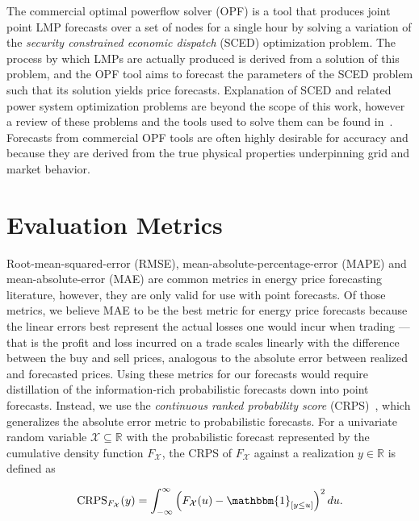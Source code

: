 The commercial optimal powerflow solver (OPF) is a tool that produces joint point LMP forecasts over a set of nodes
for a single hour by solving a variation of the \textit{security constrained economic dispatch} (SCED) optimization problem.
The process by which LMPs are actually produced is derived from a solution of this problem, and the OPF tool
aims to forecast the parameters of the SCED problem such that its solution yields price forecasts.
Explanation of SCED and related power system optimization problems are beyond the scope of this work, however a review
of these problems and the tools used to solve them can be found in~\cite{opf_textbook}.
Forecasts from commercial OPF tools are often highly desirable for accuracy and because they are derived from the true
physical properties underpinning grid and market behavior.

\section{Evaluation Metrics}\label{sec:evaluation-metrics}

Root-mean-squared-error (RMSE), mean-absolute-percentage-error (MAPE) and mean-absolute-error (MAE) are common metrics
in energy price forecasting literature, however, they are only valid for use with point forecasts.
Of those metrics, we believe MAE to be the best metric for energy price forecasts because the linear errors best
represent the actual losses one would incur when trading --- that is the profit and loss incurred on a trade scales
linearly with the difference between the buy and sell prices, analogous to the absolute error between realized and
forecasted prices.
Using these metrics for our forecasts would require distillation of the information-rich probabilistic forecasts
down into point forecasts.
Instead, we use the \textit{continuous ranked probability score} (CRPS)~\cite{crps_rules}, which generalizes the absolute error
metric to probabilistic forecasts.
For a univariate random variable $\mathcal{X} \subseteq \mathbb{R}$ with the probabilistic forecast represented by the
cumulative density function $F_\mathcal{X}$, the CRPS of $F_\mathcal{X}$ against a realization $y \in \mathbb{R}$ is defined
as

\begin{equation}
    \text{CRPS}_{F_\mathcal{X}}(y) = \int_{-\infty}^{\infty} \left(F_\mathcal{X}(u) - \mathbbm{1}_{\left[ y \leq u \right]}\right)^2 du.
    \label{eq:crps_int}
\end{equation}

